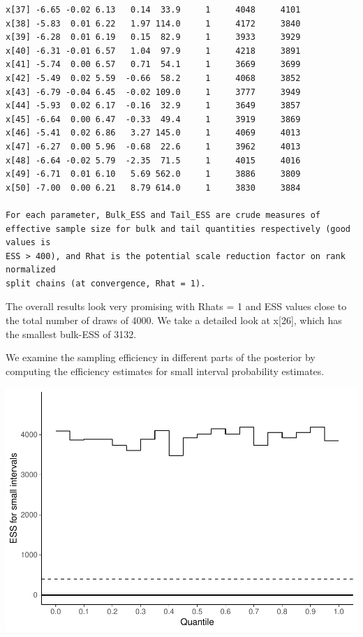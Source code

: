 \documentclass[american,]{article}
\begin{document}
\begin{verbatim}
x[37] -6.65 -0.02 6.13   0.14  33.9     1     4048     4101
x[38] -5.83  0.01 6.22   1.97 114.0     1     4172     3840
x[39] -6.28  0.01 6.19   0.15  82.9     1     3933     3929
x[40] -6.31 -0.01 6.57   1.04  97.9     1     4218     3891
x[41] -5.74  0.00 6.57   0.71  54.1     1     3669     3699
x[42] -5.49  0.02 5.59  -0.66  58.2     1     4068     3852
x[43] -6.79 -0.04 6.45  -0.02 109.0     1     3777     3949
x[44] -5.93  0.02 6.17  -0.16  32.9     1     3649     3857
x[45] -6.64  0.00 6.47  -0.33  49.4     1     3919     3869
x[46] -5.41  0.02 6.86   3.27 145.0     1     4069     4013
x[47] -6.27  0.00 5.96  -0.68  22.6     1     3962     4013
x[48] -6.64 -0.02 5.79  -2.35  71.5     1     4015     4016
x[49] -6.71  0.01 6.10   5.69 562.0     1     3886     3809
x[50] -7.00  0.00 6.21   8.79 614.0     1     3830     3884

For each parameter, Bulk_ESS and Tail_ESS are crude measures of 
effective sample size for bulk and tail quantities respectively (good values is 
ESS > 400), and Rhat is the potential scale reduction factor on rank normalized
split chains (at convergence, Rhat = 1).
\end{verbatim}

The overall results look very promising with Rhats = 1 and ESS values
close to the total number of draws of 4000. We take a detailed look at
x{[}26{]}, which has the smallest bulk-ESS of 3132.

We examine the sampling efficiency in different parts of the posterior
by computing the efficiency estimates for small interval probability
estimates.

\includegraphics{graphics/local-ess-jags-nom-1.pdf}
\end{document}
